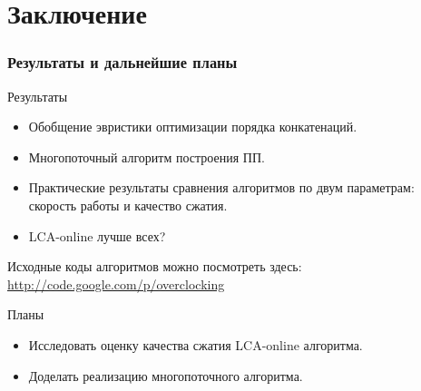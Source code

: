 ﻿\documentclass[10pt,pdf,hyperref={unicode}]{beamer}
\begin{document}
\section{Заключение}
\begin{frame}
\frametitle{Результаты и дальнейшие планы}

\begin{block}{Результаты}
	\begin{itemize}
	  \item Обобщение эвристики оптимизации порядка конкатенаций.
	  \pause
	  \item Многопоточный алгоритм построения ПП.
	  \pause
	  \item Практические результаты сравнения алгоритмов по двум параметрам: скорость работы и качество сжатия.
	  \pause
	  \item LCA-online лучше всех?
	\end{itemize}
	Исходные коды алгоритмов можно посмотреть здесь: \url{http://code.google.com/p/overclocking}
\end{block}

\pause

\begin{block}{Планы}
	\begin{itemize}
	  \item Исследовать оценку качества сжатия LCA-online алгоритма.
	  \pause
	  \item Доделать реализацию многопоточного алгоритма.
	\end{itemize}
\end{block}

\end{frame}
\end{document}
